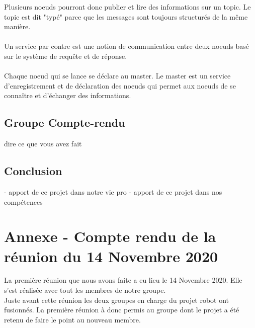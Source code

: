 \documentclass{PackagerQualityN}
\begin{document}
Plusieurs noeuds pourront donc publier et lire des informations sur un topic. Le topic est dit "typé" parce que les messages sont toujours structurés de la même manière.\\
\\
Un service par contre est une notion de communication entre deux noeuds basé sur le système de requête et de réponse.\\
\\
Chaque noeud qui se lance se déclare au master.
Le master est un service d'enregistrement et de déclaration des noeuds qui permet aux noeuds de se connaître et d'échanger des informations. 


\subsection{Groupe Compte-rendu}
    dire ce que vous avez fait
\newp           

\subsection{Conclusion}

- apport de ce projet dans notre vie pro
- apport de ce projet dans nos compétences



\newp  

\appendix
\section{Annexe - Compte rendu de la réunion du 14 Novembre 2020}
La première réunion que nous avons faite a eu lieu le 14 Novembre 2020. Elle s'est réalisée avec tout les membres de notre groupe.
\\

Juste avant cette réunion les deux groupes en charge du projet robot ont fusionnés. La première réunion à donc permis au groupe dont le projet a été retenu de faire le point au nouveau membre. 
\\
\end{document}
